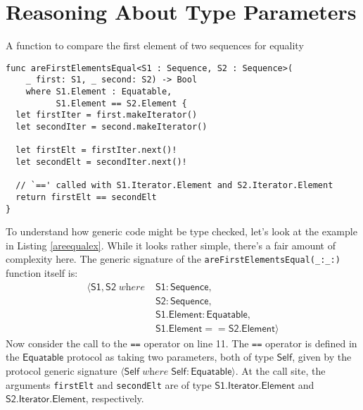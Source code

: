 \documentclass[headsepline,bibliography=totoc]{scrreport}
\newcommand{\namesym}[1]{\mathsf{#1}}
\newcommand{\genericparam}[1]{\bm{\mathsf{#1}}}
\newcommand{\proto}[1]{\bm{\mathsf{#1}}}
\newcommand{\gensig}[2]{\langle #1\;\textit{where}\;#2\rangle}
\theoremstyle{definition}
\theoremstyle{definition}
\theoremstyle{definition}
\begin{document}
\section{Reasoning About Type Parameters}
\begin{listing}\caption{A function to compare the first element of two sequences for equality}\label{areequalex}
\begin{Verbatim}
func areFirstElementsEqual<S1 : Sequence, S2 : Sequence>(
    _ first: S1, _ second: S2) -> Bool
    where S1.Element : Equatable,
          S1.Element == S2.Element {
  let firstIter = first.makeIterator()
  let secondIter = second.makeIterator()

  let firstElt = firstIter.next()!
  let secondElt = secondIter.next()!

  // `==' called with S1.Iterator.Element and S2.Iterator.Element
  return firstElt == secondElt
}
\end{Verbatim}
\end{listing}
To understand how generic code might be type checked, let's look at the example in Listing \ref{areequalex}. While it looks rather simple, there's a fair amount of complexity here. The generic signature of the \texttt{areFirstElementsEqual(\_:\_:)} function itself is:
\begin{align*}
\gensig{\genericparam{S1},\genericparam{S2}}
{&\genericparam{S1}\colon\proto{Sequence},\\
&\genericparam{S2}\colon\proto{Sequence},\\
&\genericparam{S1}.\namesym{Element}\colon\proto{Equatable},\\
&\genericparam{S1}.\namesym{Element}==\genericparam{S2}.\namesym{Element}}
\end{align*}
Now consider the call to the \texttt{==} operator on line 11. The \texttt{==} operator is defined in the $\proto{Equatable}$ protocol as taking two parameters, both of type $\genericparam{Self}$, given by the protocol generic signature $\gensig{\genericparam{Self}}{\genericparam{Self}\colon\proto{Equatable}}$. At the call site, the arguments
\texttt{firstElt} and \texttt{secondElt} are of type $\genericparam{S1}.\namesym{Iterator}.\namesym{Element}$ and
$\genericparam{S2}.\namesym{Iterator}.\namesym{Element}$, respectively.
\end{document}
